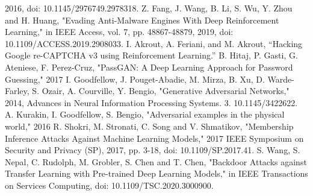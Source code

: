 \documentclass[11pt,conference]{IEEEtran}
\begin{document}
\begin{thebibliography}{00}
        2016, doi: 10.1145/2976749.2978318.
     Z. Fang, J. Wang, B. Li, S. Wu, Y. Zhou and H. Huang,
        "Evading Anti-Malware Engines With Deep Reinforcement Learning," in
        IEEE Access, vol. 7, pp. 48867-48879, 2019, doi:
        10.1109/ACCESS.2019.2908033.
     I. Akrout, A. Feriani, and M. Akrout, “Hacking  Google
        re-CAPTCHA v3 using Reinforcement Learning.”
     B. Hitaj, P. Gasti, G. Ateniese, F. Perez-Cruz, "PassGAN: A Deep Learning Approach for
        Password Guessing," 2017
     I. Goodfellow, J. Pouget-Abadie, M. Mirza, B. Xu, D.
        Warde-Farley, S. Ozair, A. Courville, Y. Bengio, "Generative
        Adversarial Networks," 2014, Advances in Neural
        Information Processing Systems. 3. 10.1145/3422622. 
     A. Kurakin, I. Goodfellow, S. Bengio, "Adversarial examples
        in the physical world," 2016
     R. Shokri, M. Stronati, C. Song and V. Shmatikov, "Membership
        Inference Attacks Against Machine Learning Models," 2017 IEEE Symposium
        on Security and Privacy (SP), 2017, pp. 3-18, doi: 10.1109/SP.2017.41.
     S. Wang, S. Nepal, C. Rudolph, M. Grobler, S. Chen and T.
        Chen, "Backdoor Attacks against Transfer Learning with Pre-trained Deep
        Learning Models," in IEEE Transactions on Services Computing, doi:
        10.1109/TSC.2020.3000900.

\end{thebibliography}
\vspace{12pt}
\end{document}
